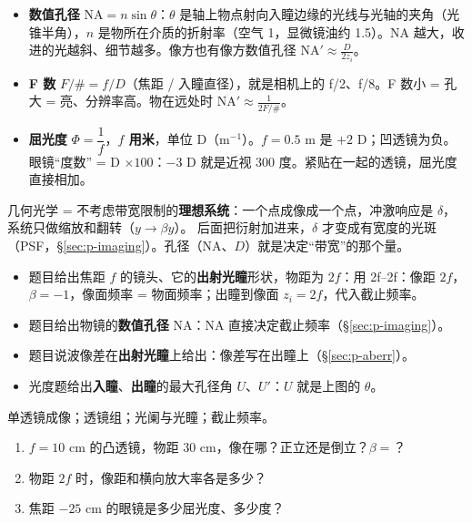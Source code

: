 \begin{itemize}
\item \textbf{数值孔径} $\mathrm{NA}=n\sin\theta$：$\theta$ 是轴上物点射向入瞳边缘的光线与光轴的夹角（光锥半角），$n$ 是物所在介质的折射率（空气 1，显微镜油约 1.5）。NA 越大，收进的光越斜、细节越多。像方也有像方数值孔径 $\mathrm{NA}'\approx\frac{D}{2z_i}$。
\item \textbf{F 数} $F/\#=f/D$（焦距 / 入瞳直径），就是相机上的 f/2、f/8。F 数小 = 孔大 = 亮、分辨率高。物在远处时 $\mathrm{NA}'\approx\frac{1}{2F/\#}$。
\item \textbf{屈光度} $\Phi=\dfrac1f$，\textbf{$f$ 用米}，单位 D（m$^{-1}$）。$f=0.5$ m 是 $+2$ D；凹透镜为负。眼镜“度数” = D $\times100$：$-3$ D 就是近视 300 度。紧贴在一起的透镜，屈光度直接相加。
\end{itemize}

\begin{idea}[类比]
几何光学 = 不考虑带宽限制的\textbf{理想系统}：一个点成像成一个点，冲激响应是 $\delta$，系统只做缩放和翻转（$y\to\beta y$）。
后面把衍射加进来，$\delta$ 才变成有宽度的光斑（PSF，§\ref{sec:p-imaging}）。孔径（NA、$D$）就是决定“带宽”的那个量。
\end{idea}

\pkao
\begin{itemize}
\item 题目给出焦距 $f$ 的镜头、它的\textbf{出射光瞳}形状，物距为 $2f$：用 2f–2f：像距 $2f$，$\beta=-1$，像面频率 = 物面频率；出瞳到像面 $z_i=2f$，代入截止频率。
\item 题目给出物镜的\textbf{数值孔径} NA：NA 直接决定截止频率（§\ref{sec:p-imaging}）。
\item 题目说波像差在\textbf{出射光瞳}上给出：像差写在出瞳上（§\ref{sec:p-aberr}）。
\item 光度题给出\textbf{入瞳}、\textbf{出瞳}的最大孔径角 $U$、$U'$：$U$ 就是上图的 $\theta$。
\end{itemize}

\psee 单透镜成像\pageref{sec:lensimg}；透镜组\pageref{sec:lenscombo}；光阑与光瞳\pageref{sec:stops}；截止频率\pageref{sec:typeA}。

\begin{enumerate}[label=\arabic*.]
\item $f=10$ cm 的凸透镜，物距 30 cm，像在哪？正立还是倒立？$\beta=$？
\item 物距 $2f$ 时，像距和横向放大率各是多少？
\item 焦距 $-25$ cm 的眼镜是多少屈光度、多少度？
\end{enumerate}

